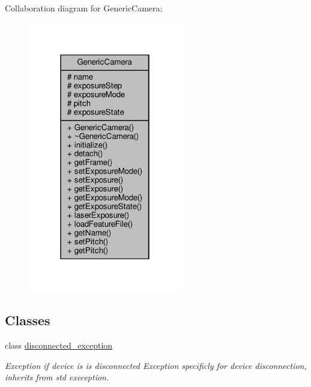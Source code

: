 Collaboration diagram for Generic\+Camera\+:
\nopagebreak
\begin{figure}[H]
\begin{center}
\leavevmode
\includegraphics[width=190pt]{class_generic_camera__coll__graph}
\end{center}
\end{figure}
\subsection*{Classes}
\begin{DoxyCompactItemize}
\item 
class \hyperlink{class_generic_camera_1_1disconnected__exception}{disconnected\+\_\+exception}
\begin{DoxyCompactList}\small\item\em Exception if device is is disconnected Exception specificly for device disconnection, inherits from std exeception. \end{DoxyCompactList}\end{DoxyCompactItemize}

